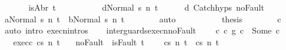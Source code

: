 \begin{isabellebody}
\ \ \ \ \isamarkupfalse%
\ {\isachardoublequoteopen}{\isasymnot}\ isAbr\ t{\isachardoublequoteclose}\isanewline
\ \ \ \ \isamarkupfalse%
\isanewline
\ \ \ \ \isamarkupfalse%
\ {\isachardoublequoteopen}{\isasymGamma}{\isasymturnstile}{\isasymlangle}d{}{\isacharcomma}Normal\ s{\isasymrangle}\ {\isacharequal}n{\isasymRightarrow}\ t{\isachardoublequoteclose}\isanewline
\ \ \ \ \isamarkupfalse%
\ d{}\ Catch{\isachardot}hyps\ noFault\isanewline
\ \ \ \ \isamarkupfalse%
\ {\isachardoublequoteopen}{\isasymGamma}{\isasymturnstile}{\isasymlangle}a{}{\isacharcomma}Normal\ s{\isasymrangle}\ {\isacharequal}n{\isasymRightarrow}\ t{\isachardoublequoteclose}\ \ {\isachardoublequoteopen}{\isasymGamma}{\isasymturnstile}{\isasymlangle}b{}{\isacharcomma}Normal\ s{\isasymrangle}\ {\isacharequal}n{\isasymRightarrow}\ t{\isachardoublequoteclose}\isanewline
\ \ \ \ \ \ \isamarkupfalse%
\ auto\isanewline
\ \ \ \ \isamarkupfalse%
\isanewline
\ \ \ \ \isamarkupfalse%
\ {\isacharquery}thesis\isanewline
\ \ \ \ \ \ \isamarkupfalse%
\ c{}\ \isamarkupfalse%
\ {\isacharparenleft}auto\ intro{\isacharcolon}\ execn{\isachardot}intros{\isacharparenright}\isanewline
\ \ \isamarkupfalse%
\isanewline
{}\isamarkupfalse%
%
\endisatagproof
{\isafoldproof}%
%
\isadelimproof
\isanewline
%
\endisadelimproof
\isanewline
\isanewline
{}\isamarkupfalse%
\ inter{\isacharunderscore}guards{\isacharunderscore}execn{\isacharunderscore}noFault{\isacharcolon}\ \isanewline
\ \ \ c{\isacharcolon}\ {\isachardoublequoteopen}{\isacharparenleft}c{}\ {\isasyminter}\isactrlsub g\ c{}{\isacharparenright}\ {\isacharequal}\ Some\ c{\isachardoublequoteclose}\isanewline
\ \ \ exec{\isacharunderscore}c{\isacharcolon}\ {\isachardoublequoteopen}{\isasymGamma}{\isasymturnstile}{\isasymlangle}c{\isacharcomma}s{\isasymrangle}\ {\isacharequal}n{\isasymRightarrow}\ t{\isachardoublequoteclose}\isanewline
\ \ \ noFault{\isacharcolon}\ {\isachardoublequoteopen}{\isasymnot}\ isFault\ t{\isachardoublequoteclose}\ \isanewline
\ \ \ {\isachardoublequoteopen}{\isasymGamma}{\isasymturnstile}{\isasymlangle}c{}{\isacharcomma}s{\isasymrangle}\ {\isacharequal}n{\isasymRightarrow}\ t\ {\isasymand}\ {\isasymGamma}{\isasymturnstile}{\isasymlangle}c{}{\isacharcomma}s{\isasymrangle}\ {\isacharequal}n{\isasymRightarrow}\ t{\isachardoublequoteclose}\isanewline

\end{isabellebody}
